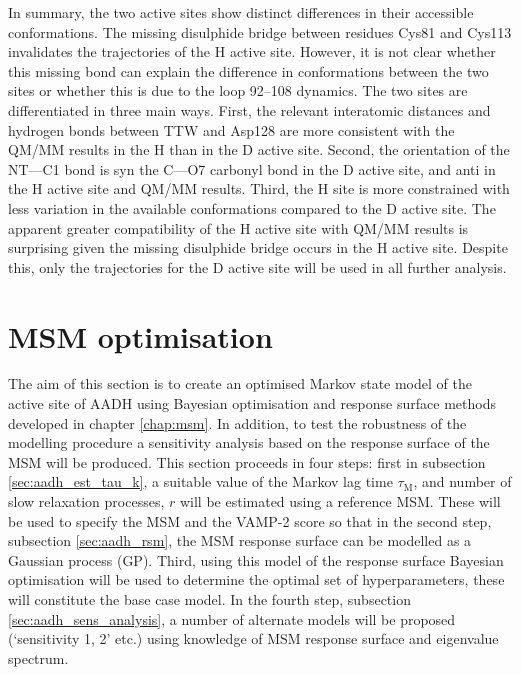 In summary, the two active sites show distinct differences in their accessible conformations. The missing disulphide bridge between residues Cys81 and Cys113 invalidates the trajectories of the H active site. However, it is not clear whether this missing bond can explain the difference in conformations between the two sites or whether this is due to the loop \numrange[range-phrase=\text{--}]{92}{108} dynamics. The two sites are differentiated in three main ways. First, the relevant interatomic distances and hydrogen bonds between TTW and Asp128 are more consistent with the QM/MM results in the H than in the D active site. Second, the orientation of the NT---C1 bond is syn the C---O7 carbonyl bond in the D active site, and anti in the H active site and QM/MM results. Third, the H site is more constrained with less variation in the available conformations compared to the  D active site. The apparent greater compatibility of the H active site with QM/MM results is surprising given the missing disulphide bridge occurs in the H active site. Despite this, only the trajectories for the D active site will be used in all further analysis.  

\section{MSM optimisation}\label{sec:aadh_optimisation}

The aim of this section is to create an optimised Markov state model of the active site of AADH using Bayesian optimisation and response surface methods developed in chapter \ref{chap:msm}. In addition, to test the robustness of the modelling procedure a sensitivity analysis based on the response surface of the MSM will be produced. This section proceeds in four steps: first in subsection \ref{sec:aadh_est_tau_k}, a suitable  value of the Markov lag time $\tau_{\mathrm{M}}$, and number of slow relaxation processes, $r$ will be estimated using a reference MSM. These will be used to specify the MSM and the VAMP-2 score so that in the second step, subsection \ref{sec:aadh_rsm},  the MSM response surface can be modelled as a Gaussian process (GP). Third, using this model of the response surface Bayesian optimisation will be used to determine the optimal set of hyperparameters, these will constitute the base case model.  In the fourth step, subsection \ref{sec:aadh_sens_analysis}, a number of alternate models will be proposed (`sensitivity 1, 2' etc.)  using knowledge of MSM response surface and eigenvalue spectrum.  


